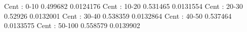 Cent : 0-10
0.499682 0.0124176
Cent : 10-20
0.531465 0.0131554
Cent : 20-30
0.52926 0.0132001
Cent : 30-40
0.538359 0.0132864
Cent : 40-50
0.537464 0.0133575
Cent : 50-100
0.558579 0.0139902
